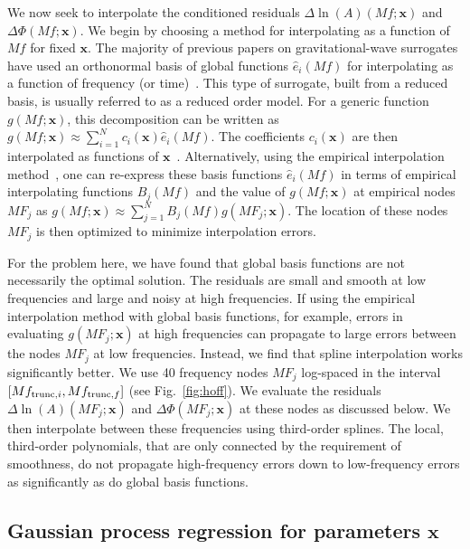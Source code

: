 \documentclass[prd,aps,letter,twocolumn,floatfix,notitlepage,nofootinbib]{revtex4-1}
\def\bx{\mathbf{x}}
\begin{document}
We now seek to interpolate the conditioned residuals $\Delta\ln(A)(Mf; \bx)$ and $\Delta\Phi(Mf; \bx)$. We begin by choosing a method for interpolating as a function of $Mf$ for fixed $\bx$. The majority of previous papers on gravitational-wave surrogates have used an orthonormal basis of global functions $\hat e_i(Mf)$ for interpolating as a function of frequency (or time)~\cite{Puerrer2014, Puerrer2015, FieldGalleyHesthaven2014, LackeyBernuzziGalley2017, BlackmanFieldGalley2015, BlackmanFieldScheel2017a, BlackmanFieldScheel2017b}. This type of surrogate, built from a reduced basis, is usually referred to as a reduced order model. For a generic function $g(Mf; \bx)$, this decomposition can be written as $g(Mf; \bx) \approx \sum_{i=1}^N c_i(\bx) \hat e_i(Mf)$. The coefficients $c_i(\bx)$ are then interpolated as functions of $\bx$~\cite{Puerrer2014, Puerrer2015}. Alternatively, using the empirical interpolation method~\cite{Barrault2004, Chaturantabut2010, FieldGalleyHesthaven2014}, one can re-express these basis functions $\hat e_i(Mf)$ in terms of empirical interpolating functions $B_j(Mf)$ and the value of $g(Mf; \bx)$ at empirical nodes $MF_j$ as $g(Mf; \bx) \approx \sum_{j=1}^N B_j(Mf) g(MF_j; \bx)$. The location of these nodes $MF_j$ is then optimized to minimize interpolation errors.

For the problem here, we have found that global basis functions are not necessarily the optimal solution. The residuals are small and smooth at low frequencies and large and noisy at high frequencies. If using the empirical interpolation method with global basis functions, for example, errors in evaluating $g(MF_j;\bx)$ at high frequencies can propagate to large errors between the nodes $MF_j$ at low frequencies. Instead, we find that spline interpolation works significantly better. We use 40 frequency nodes $MF_j$ log-spaced in the interval $[Mf_{{\rm trunc}, i}, Mf_{{\rm trunc}, f}]$ (see Fig.~\ref{fig:hoff}). We evaluate the residuals $\Delta\ln(A)(MF_j; \bx)$ and $\Delta\Phi(MF_j; \bx)$ at these nodes as discussed below. We then interpolate between these frequencies using third-order splines. The local, third-order polynomials, that are only connected by the requirement of smoothness, do not propagate high-frequency errors down to low-frequency errors as significantly as do global basis functions.


\subsection{Gaussian process regression for parameters $\bx$}
\end{document}
